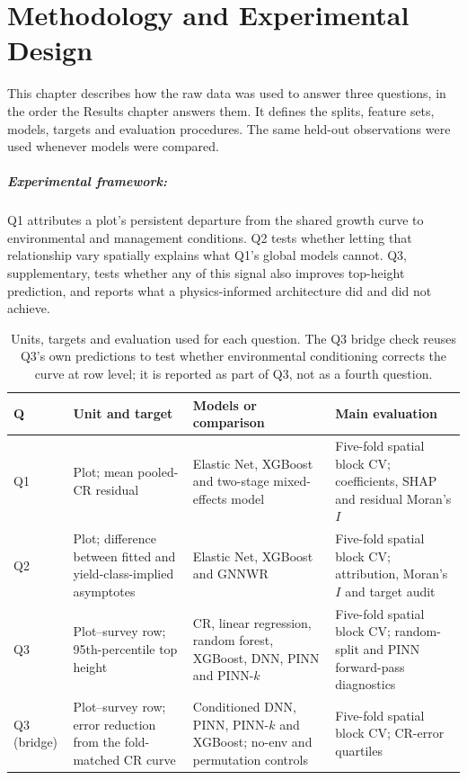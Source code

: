\chapter{Methodology and Experimental Design} \label{ch:methodology}
This chapter describes how the raw data was used to answer three questions, in the
order the Results chapter answers them. It defines the splits, feature sets, models,
targets and evaluation procedures. The same held-out observations were used whenever
models were compared.

\paragraph*{Experimental framework:} Q1 attributes a plot's persistent departure from
the shared growth curve to environmental and management conditions. Q2 tests whether
letting that relationship vary spatially explains what Q1's global models cannot. Q3,
supplementary, tests whether any of this signal also improves top-height prediction,
and reports what a physics-informed architecture did and did not achieve.
\begin{table}[!ht]
\centering
\footnotesize
\renewcommand{\arraystretch}{1.15}

\begin{tabular}{
@{}
>{\raggedright\arraybackslash}p{0.9cm}
>{\raggedright\arraybackslash}p{3.5cm}
>{\raggedright\arraybackslash}p{3.2cm}
>{\raggedright\arraybackslash}p{2.8cm}
@{}
}
\toprule
Q & Unit and target & Models or comparison & Main evaluation \\
\midrule
Q1 & Plot; mean pooled-CR residual & Elastic Net, XGBoost and two-stage
mixed-effects model & Five-fold spatial block CV; coefficients, SHAP and residual Moran's $I$ \\
Q2 & Plot; difference between fitted and yield-class-implied asymptotes & Elastic Net, XGBoost
and GNNWR & Five-fold spatial block CV; attribution, Moran's $I$ and target audit \\
Q3 & Plot--survey row; 95th-percentile top height & CR, linear regression, random forest,
XGBoost, DNN, PINN and PINN-$k$ & Five-fold spatial block CV; random-split and PINN
forward-pass diagnostics \\
Q3 (bridge) & Plot--survey row; error reduction from the fold-matched CR curve & Conditioned
DNN, PINN, PINN-$k$ and XGBoost; no-env and permutation controls & Five-fold spatial block
CV; CR-error quartiles \\
\bottomrule
\end{tabular}
\caption{Units, targets and evaluation used for each question. The Q3 bridge check reuses
Q3's own predictions to test whether environmental conditioning corrects the curve at row
level; it is reported as part of Q3, not as a fourth question.}
\label{tab:rq-framework}
\end{table}

